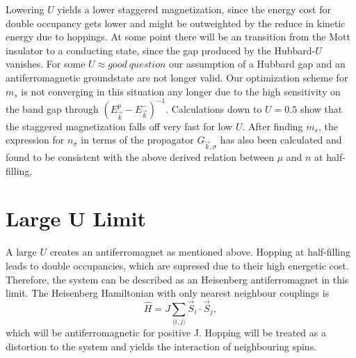 \documentclass[a4paper,10pt]{report}
\begin{document}
Lowering $U$ yields a lower staggered magnetization, since the energy cost for double occupancy gets lower and might be outweighted by
the reduce in kinetic energy due to hoppings.
%
At some point there will be an transition from the Mott insulator to a conducting state, since the gap produced by the Hubbard-$U$ vanishes. 
For some $U \approx good \: question$ our assumption of a Hubbard gap and an antiferromagnetic groundstate are not longer valid. 
Our optimization scheme for $m_s$ is not converging in this situation any longer due to the high sensitivity on the band gap through $(E^p_{\vec k} - E^-_{\vec k})^{-1}$.
Calculations down to $U=0.5$ show that the staggered magnetization falls off very fast for low $U$.
After finding $m_{s}$, the expression for $n_{\sigma}$ in terms of the propagator $G_{\vec k,\sigma}$ has also been calculated and found to be consistent with 
the above derived relation between $\mu$ and $n$ at half-filling.



\section{Large U Limit}

A large $U$ creates an antiferromagnet as mentioned above. 
Hopping at half-filling leads to double occupancies, which are supresed due to their high energetic cost. 
Therefore, the system can be described as an Heisenberg antiferromagnet in this limit.
The Heisenberg Hamiltonian with only nearest neighbour couplings is
\begin{equation}
 \hat H = J \sum_{\langle i,j\rangle} \vec{S}_i \cdot \vec{S}_j,
\end{equation}
which will be antiferromagnetic for positive J. 
Hopping will be treated as a distortion to the system and yields the interaction of neighbouring spins.

%
%
\end{document}
